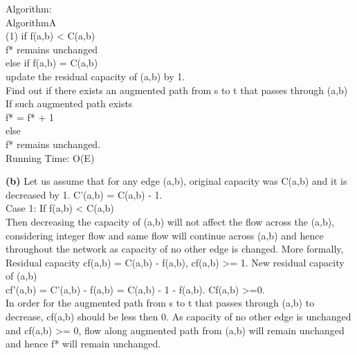 	Algorithm: \\
	AlgorithmA\\
	(1) if f(a,b) < C(a,b)\\
			f* remains unchanged\\
		else if f(a,b) = C(a,b)\\
			update the residual capacity of (a,b) by 1.\\
			Find out if there exists an augmented path from s to t that passes through (a,b)\\
			If such augmented path exists\\
				f* = f* + 1\\
			else\\
				f* remains unchanged. \\
	

Running Time: O(E)


\textbf{(b)	}
	Let us assume that for any edge (a,b), original capacity was C(a,b) and it is decreased by 1. C'(a,b) = C(a,b) - 1. \\
	Case 1: If f(a,b) < C(a,b) \\
	Then decreasing the capacity of (a,b) will not affect the flow across the (a,b), considering integer flow and same flow will continue across (a,b) and hence throughout the network as capacity of no other edge is changed. More formally, \\
	Residual capacity cf(a,b) = C(a,b) - f(a,b), cf(a,b) >= 1. New residual capacity of (a,b)\\
					cf'(a,b) = C'(a,b) - f(a,b) = C(a,b) - 1 - f(a,b). Cf(a,b) >=0.\\
	In order for the augmented path from s to t that passes through (a,b) to decrease, cf(a,b) should be less then 0. As capacity of no other edge is unchanged and cf(a,b) >= 0, flow along augmented path from (a,b) will remain unchanged and hence f* will remain unchanged. \\
	
